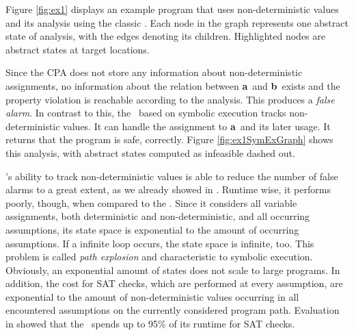 Figure \ref{fig:ex1} displays an example program that uses non-deterministic values and its analysis using the classic .
Each node in the graph represents one abstract state of analysis, with the edges denoting its children. Highlighted nodes are abstract states at target locations.

Since the CPA does not store any information about non-deterministic assignments, no information about the relation between \textbf{a}\ and \textbf{b}\ exists and the property violation is reachable according to the analysis. This produces a \emph{false alarm}.
In contrast to this, the \symbolicExecutionCPA\ based on symbolic execution \cite{King1976} tracks non-deterministic values. It can handle the assignment to \textbf{a}\ and its later usage. It returns that the program is safe, correctly.
Figure \ref{fig:ex1SymExGraph} shows this analysis, with abstract states computed as infeasible dashed out. 

\SymbolicExecutionCPA's ability to track non-deterministic values is able to reduce the number of false alarms to a great extent, as we already showed in \cite{Lemberger2015}.
Runtime wise, it performs poorly, though, when compared to the .
Since it considers all variable assignments, both deterministic and non-deterministic, and all occurring assumptions, its state space is exponential to the amount of occurring assumptions.
If a infinite loop occurs, the state space is infinite, too.
This problem is called \emph{path explosion} and characteristic to symbolic execution.\cite{Anand2008}
Obviously, an exponential amount of states does not scale to large programs.
In addition, the cost for SAT checks, which are performed at every assumption, are exponential to the amount of non-deterministic values occurring in all encountered assumptions on the currently considered program path.
Evaluation in \cite{Lemberger2015} showed that the \symbolicExecutionCPA\ spends up to 95\% of its runtime for SAT checks.

